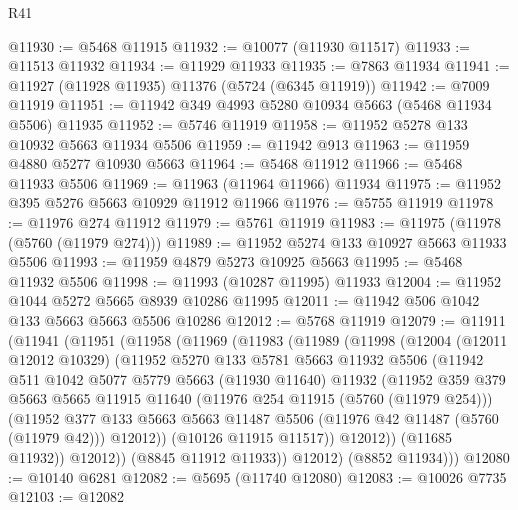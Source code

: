 \begin{lexlean}{R41}
\begin{coremodule}
@11930 := @5468 @11915
@11932 := @10077 (@11930 @11517)
@11933 := @11513 @11932
@11934 := @11929 @11933
@11935 := @7863 @11934
@11941 := @11927 (@11928 @11935) @11376 (@5724 (@6345 @11919))
@11942 := @7009 @11919
@11951 := @11942 @349 @4993 @5280 @10934 @5663 (@5468 @11934 @5506) @11935
@11952 := @5746 @11919
@11958 := @11952 @5278 @133 @10932 @5663 @11934 @5506
@11959 := @11942 @913
@11963 := @11959 @4880 @5277 @10930 @5663
@11964 := @5468 @11912
@11966 := @5468 @11933 @5506
@11969 := @11963 (@11964 @11966) @11934
@11975 := @11952 @395 @5276 @5663 @10929 @11912 @11966
@11976 := @5755 @11919
@11978 := @11976 @274 @11912
@11979 := @5761 @11919
@11983 := @11975 (@11978 (@5760 (@11979 @274)))
@11989 := @11952 @5274 @133 @10927 @5663 @11933 @5506
@11993 := @11959 @4879 @5273 @10925 @5663
@11995 := @5468 @11932 @5506
@11998 := @11993 (@10287 @11995) @11933
@12004 := @11952 @1044 @5272 @5665 @8939 @10286 @11995
@12011 := @11942 @506 @1042 @133 @5663 @5663 @5506 @10286
@12012 := @5768 @11919
@12079 := @11911
    (@11941
      (@11951
        (@11958
          (@11969
            (@11983
              (@11989
                (@11998
                  (@12004
                    (@12011 @12012 @10329)
                    (@11952
                      @5270
                      @133
                      @5781
                      @5663
                      @11932
                      @5506
                      (@11942
                        @511
                        @1042
                        @5077
                        @5779
                        @5663
                        (@11930 @11640)
                        @11932
                        (@11952
                          @359
                          @379
                          @5663
                          @5665
                          @11915
                          @11640
                          (@11976 @254 @11915 (@5760 (@11979 @254)))
                          (@11952
                            @377
                            @133
                            @5663
                            @5663
                            @11487
                            @5506
                            (@11976 @42 @11487 (@5760 (@11979 @42)))
                            @12012))
                        (@10126 @11915 @11517))
                      @12012))
                  (@11685 @11932))
                @12012))
            (@8845 @11912 @11933))
          @12012)
        (@8852 @11934)))
@12080 := @10140 @6281
@12082 := @5695 (@11740 @12080)
@12083 := @10026 @7735
@12103 := @12082

\end{coremodule}
\end{lexlean}
